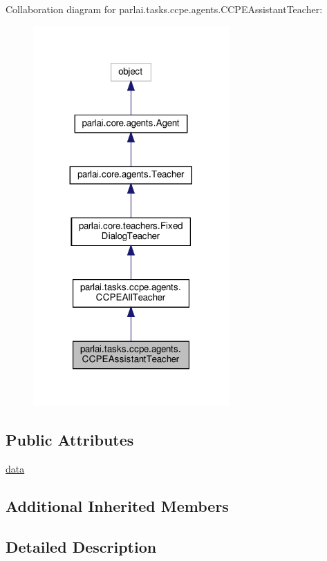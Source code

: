 Collaboration diagram for parlai.\+tasks.\+ccpe.\+agents.\+C\+C\+P\+E\+Assistant\+Teacher\+:\nopagebreak
\begin{figure}[H]
\begin{center}
\leavevmode
\includegraphics[width=212pt]{d2/d60/classparlai_1_1tasks_1_1ccpe_1_1agents_1_1CCPEAssistantTeacher__coll__graph}
\end{center}
\end{figure}
\subsection*{Public Attributes}
\begin{DoxyCompactItemize}
\item 
\hyperlink{classparlai_1_1tasks_1_1ccpe_1_1agents_1_1CCPEAssistantTeacher_aeb95d397c64b27bdd7d99270a86ca190}{data}
\end{DoxyCompactItemize}
\subsection*{Additional Inherited Members}


\subsection{Detailed Description}


